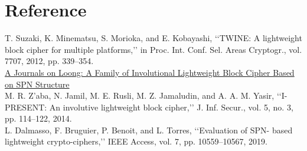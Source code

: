 \documentclass[preprint]{transcrypto}
\begin{document}
\section{Reference}
T. Suzaki, K. Minematsu, S. Morioka, and E. Kobayashi, ‘‘TWINE:
A lightweight block cipher for multiple platforms,’’ in Proc. Int. Conf. Sel.
Areas Cryptogr., vol. 7707, 2012, pp. 339–354.\\
\textcolor{black}{\href{https://ieeexplore.ieee.org/abstract/document/8830399}{A Journals on Loong: A Family of Involutional Lightweight Block Cipher Based on SPN Structure}}\\
M. R. Z’aba, N. Jamil, M. E. Rusli, M. Z. Jamaludin, and A. A. M. Yasir,
‘‘I-PRESENT: An involutive lightweight block cipher,’’ J. Inf. Secur.,
vol. 5, no. 3, pp. 114–122, 2014.\\
L. Dalmasso, F. Bruguier, P. Benoit, and L. Torres, ‘‘Evaluation of SPN-
based lightweight crypto-ciphers,’’ IEEE Access, vol. 7, pp. 10559–10567,
2019.


\end{document}
